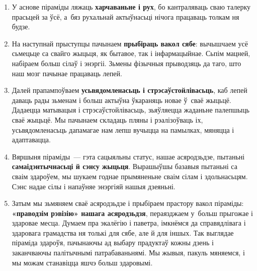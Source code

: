 \begin{enumerate}
  \item У аснове піраміды ляжаць \textbf{харчаваньне і рух}, бо кантраляваць сваю талерку прасьцей за ўсё, а~бяз рухальнай актыўнасьці нічога працаваць толкам ня будзе.
  \item На наступнай прыступцы пачынаем \textbf{прыбіраць вакол сябе}: вычышчаем усё сьмецьце са свайго жыцьця, як бытавое, так і інфармацыйнае. Сьпім мацней, набіраем больш сілаў і энэргіі. Зьмены фізычныя прыводзяць да таго, што наш мозг пачынае працаваць лепей.
  \item Далей прапампоўваем \textbf{усьвядомленасьць і стрэсаўстойлівасьць}, каб лепей даваць рады зьменам і больш актыўна ўкараняць новае ў~сваё жыцьцё. Дадаецца матывацыя і стрэсаўстойлівасьць, зьяўляецца жаданьне палепшыць сваё жыцьцё. Мы пачынаем складаць пляны і рэалізоўваць іх, усьвядомленасьць дапамагае нам лепш вучыцца на памылках, мяняцца і адаптавацца.
  \item Вяршыня піраміды~--- гэта сацыяльны статус, нашае асяродзьдзе, пытаньні \textbf{самаідэнтычнасьці й сэнсу жыцьця}. Вырашыўшы базавыя пытаньні са сваім здароўем, мы шукаем годнае прымяненьне сваім сілам і здольнасьцям. Сэнс надае сілы і напаўняе энэргіяй нашыя дзеяньні.
  \item Затым мы зьмяняем сваё асяродзьдзе і прыбіраем прастору вакол піраміды: \textbf{«праводзім рэвізію» нашага асяродзьдзя}, пераязджаем у~больш прыгожае і здаровае месца. Думаем пра экалёгію і паветра, імкнёмся да справядлівага і здаровага грамадства ня толькі для сябе, але й для іншых. Так выглядае піраміда здароўя, пачынаючы ад выбару прадуктаў кожны дзень і заканчваючы палітычнымі патрабаваньнямі. Мы жывыя, пакуль мяняемся, і мы можам станавіцца яшчэ больш здаровымі.
\end{enumerate}

